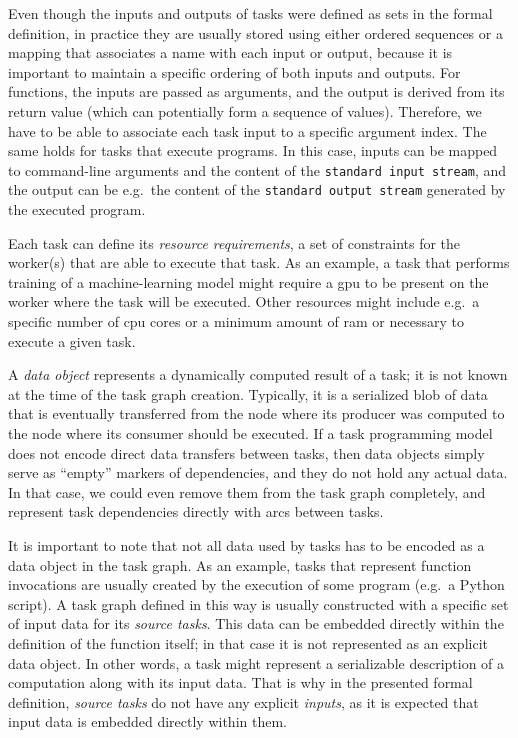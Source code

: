 Even though the inputs and outputs of tasks were defined as sets in the formal definition, in
practice they are usually stored using either ordered sequences or a mapping that associates a name
with each input or output, because it is important to maintain a specific ordering of both inputs
and outputs. For functions, the inputs are passed as arguments, and the output is derived from its
return value (which can potentially form a sequence of values). Therefore, we have to be able to
associate each task input to a specific argument index. The same holds for tasks that execute
programs. In this case, inputs can be mapped to command-line arguments and the content of the
\texttt{standard input stream}, and the output can be e.g.\ the content of the \texttt{standard output stream}
generated by the executed program.

Each task can define its \emph{resource requirements}, a set of constraints for the worker(s) that are
able to execute that task. As an example, a task that performs training of a machine-learning model
might require a \gls{gpu} to be present on the worker where the task will be executed.
Other resources might include e.g.\ a specific number of \gls{cpu} cores or a minimum
amount of \gls{ram} or necessary to execute a given task.

A \emph{data object} represents a dynamically computed result of a task; it is not known at the
time of the task graph creation. Typically, it is a serialized blob of data that is eventually
transferred from the node where its producer was computed to the node where its consumer should be
executed. If a task programming model does not encode direct data transfers between tasks, then
data objects simply serve as ``empty'' markers of dependencies, and they do not hold any actual
data. In that case, we could even remove them from the task graph completely, and represent task
dependencies directly with arcs between tasks.

It is important to note that not all data used by tasks has to be encoded as a data object in the
task graph. As an example, tasks that represent function invocations are usually created by the
execution of some program (e.g.\ a Python script). A task graph defined in this way is usually
constructed with a specific set of input data for its \emph{source tasks}. This data can be
embedded directly within the definition of the function itself; in that case it is not represented
as an explicit data object. In other words, a task might represent a serializable description of a
computation along with its input data. That is why in the presented formal definition,
\emph{source tasks} do not have any explicit \emph{inputs}, as it is expected that
input data is embedded directly within them.

